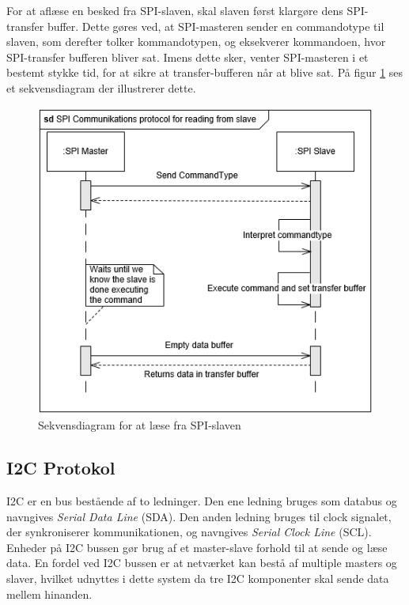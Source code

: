 For at aflæse en besked fra SPI-slaven, skal slaven først klargøre dens SPI-transfer buffer. Dette gøres ved, at SPI-masteren sender en commandotype til slaven, som derefter tolker kommandotypen, og eksekverer kommandoen, hvor SPI-transfer bufferen bliver sat. Imens dette sker, venter SPI-masteren i et bestemt stykke tid, for at sikre at transfer-bufferen når at blive sat. På figur \ref{figure:SDSpiReadSlave} ses et sekvensdiagram der illustrerer dette. 

\begin{figure}[H]
	\centering
	\includegraphics[]{SystemArkitektur/images/SDSpiSlaveRead}
	\caption{Sekvensdiagram for at læse fra SPI-slaven}
	\label{figure:SDSpiReadSlave}
\end{figure}


\subsection{I2C Protokol}
\label{afsnit:I2CProtokol}

I2C\cite{I2C} er en bus bestående af to ledninger. Den ene ledning bruges som databus og navngives \textit{Serial Data Line} (SDA). Den anden ledning bruges til clock signalet, der synkroniserer kommunikationen, og navngives \textit{Serial Clock Line} (SCL). Enheder på I2C bussen gør brug af et master-slave forhold til at sende og læse data. En fordel ved I2C bussen er at netværket kan bestå af multiple masters og slaver, hvilket udnyttes i dette system da tre I2C komponenter skal sende data mellem hinanden.

